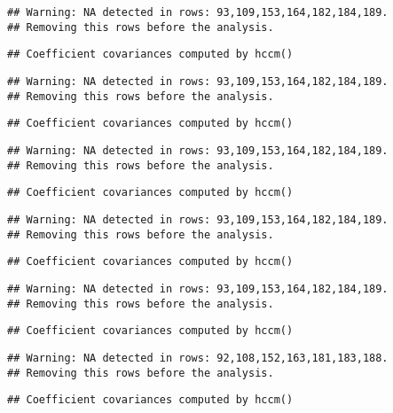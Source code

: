 \documentclass[
]{article}
\begin{document}
\begin{verbatim}
## Warning: NA detected in rows: 93,109,153,164,182,184,189.
## Removing this rows before the analysis.
\end{verbatim}

\begin{verbatim}
## Coefficient covariances computed by hccm()
\end{verbatim}

\begin{verbatim}
## Warning: NA detected in rows: 93,109,153,164,182,184,189.
## Removing this rows before the analysis.
\end{verbatim}

\begin{verbatim}
## Coefficient covariances computed by hccm()
\end{verbatim}

\begin{verbatim}
## Warning: NA detected in rows: 93,109,153,164,182,184,189.
## Removing this rows before the analysis.
\end{verbatim}

\begin{verbatim}
## Coefficient covariances computed by hccm()
\end{verbatim}

\begin{verbatim}
## Warning: NA detected in rows: 93,109,153,164,182,184,189.
## Removing this rows before the analysis.
\end{verbatim}

\begin{verbatim}
## Coefficient covariances computed by hccm()
\end{verbatim}

\begin{verbatim}
## Warning: NA detected in rows: 93,109,153,164,182,184,189.
## Removing this rows before the analysis.
\end{verbatim}

\begin{verbatim}
## Coefficient covariances computed by hccm()
\end{verbatim}

\begin{verbatim}
## Warning: NA detected in rows: 92,108,152,163,181,183,188.
## Removing this rows before the analysis.
\end{verbatim}

\begin{verbatim}
## Coefficient covariances computed by hccm()
\end{verbatim}
\end{document}
